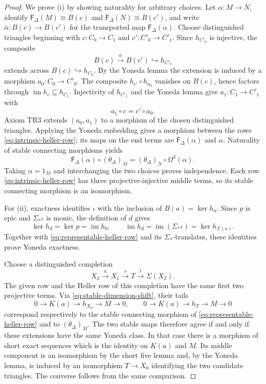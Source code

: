 \documentclass[a4paper,11pt,reqno]{amsart}
\theoremstyle{definition}
\theoremstyle{plain}
\numberwithin{equation}{section}
\begin{document}
\begin{proof}
We prove \textup{(i)} by showing naturality for arbitrary choices.  Let
$\alpha:M\to N$, identify $\mathsf F_\Delta(M)\cong B(c)$ and
$\mathsf F_\Delta(N)\cong B(c')$, and write
$\bar\alpha:B(c)\to B(c')$ for the transported map
$\mathsf F_\Delta(\alpha)$.  Choose distinguished triangles beginning
with $c:C_0\to C_1$ and $c':C'_0\to C'_1$.  Since $h_{C'_0}$ is
injective, the composite
\[
 B(c)\xrightarrow{\bar\alpha}B(c')\hookrightarrow h_{C'_0}
\]
extends across $B(c)\hookrightarrow h_{C_0}$.  By the Yoneda lemma the
extension is induced by a morphism $a_0:C_0\to C'_0$.  The composite
$h_{c'}\circ h_{a_0}$ vanishes on $B(c)$, hence factors through
$\operatorname{im}h_c\subseteq h_{C_1}$.  Injectivity of $h_{C'_1}$ and
the Yoneda lemma give $a_1:C_1\to C'_1$ with
\[
 a_1\circ c=c'\circ a_0.
\]
Axiom $\mathrm{TR3}$ extends $(a_0,a_1)$ to a morphism of the chosen
distinguished triangles.  Applying the Yoneda embedding gives a morphism
between the rows \eqref{eq:intrinsic-heller-row}; its maps on the end terms
are $\mathsf F_\Delta(\alpha)$ and $\alpha$.  Naturality of stable
connecting morphisms yields
\[
 \mathsf F_\Delta(\alpha)\circ(\theta_\Delta)_M
 = (\theta_\Delta)_N\circ\Omega^3(\alpha).
\]
Taking $\alpha=1_M$ and interchanging the two choices proves independence.
Each row \eqref{eq:intrinsic-heller-row} has three projective-injective
middle terms, so its stable connecting morphism is an isomorphism.

For \textup{(ii)}, exactness identifies $\iota$ with the inclusion of
$B(a)=\ker h_a$.  Since $p$ is epic and $\Sigma_*\iota$ is monic, the
definition of $d$ gives
\[
 \ker h_d=\ker p=\operatorname{im}h_b,
 \qquad
 \operatorname{im}h_d=\operatorname{im}(\Sigma_*\iota)
 =\ker h_{\Sigma(a)}.
\]
Together with \eqref{eq:representable-heller-row} and its
$\Sigma_*$-translates, these identities prove Yoneda exactness.

Choose a distinguished completion
\[
 X_2\xrightarrow{a}X_1\xrightarrow{s}T
 \xrightarrow{t}\Sigma(X_2).
\]
The given row and the Heller row of this completion have the same first
two projective terms.  Via \eqref{eq:stable-dimension-shift}, their tails
\[
 0\longrightarrow K(a)\longrightarrow h_{X_0}
   \longrightarrow M\longrightarrow0,
 \qquad
 0\longrightarrow K(a)\longrightarrow h_T
   \longrightarrow M\longrightarrow0
\]
correspond respectively to the stable connecting morphism of
\eqref{eq:representable-heller-row} and to $(\theta_\Delta)_M$.  The two
stable maps therefore agree if and only if these extensions have the same
Yoneda class.  In that case there is a morphism of short exact sequences
which is the identity on $K(a)$ and $M$.  Its middle component is an
isomorphism by the short five lemma and, by the Yoneda lemma, is induced by
an isomorphism $T\to X_0$ identifying the two candidate triangles.  The
converse follows from the same comparison.
\end{proof}
\end{document}
